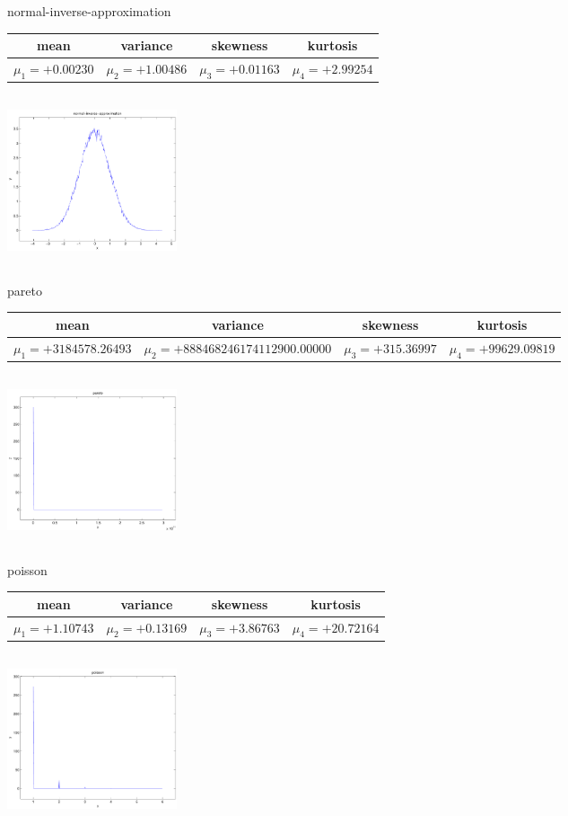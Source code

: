 \documentclass[9pt]{article}
\theoremstyle{plain}
\theoremstyle{definition}
\theoremstyle{remark}
\numberwithin{equation}{section}
\begin{document}
\newpage
normal-inverse-approximation \begin{tabular}{|c|c|c|c|}  mean & variance & skewness & kurtosis \\  \hline
$\mu_1 = +0.00230$ & $\mu_2 = +1.00486$ & $\mu_3 = +0.01163$ & $\mu_4 =+2.99254$ \\
\end{tabular}

\includegraphics[width=5cm,height=5cm]{normal-inverse-approximation.pdf}

pareto \begin{tabular}{|c|c|c|c|}  mean & variance & skewness & kurtosis \\  \hline
$\mu_1 = +3184578.26493$ & $\mu_2 = +888468246174112900.00000$ & $\mu_3 = +315.36997$ & $\mu_4 =+99629.09819$ \\
\end{tabular}

\includegraphics[width=5cm,height=5cm]{pareto.pdf}

poisson \begin{tabular}{|c|c|c|c|}  mean & variance & skewness & kurtosis \\  \hline
$\mu_1 = +1.10743$ & $\mu_2 = +0.13169$ & $\mu_3 = +3.86763$ & $\mu_4 =+20.72164$ \\
\end{tabular}

\includegraphics[width=5cm,height=5cm]{poisson.pdf}
\end{document}
